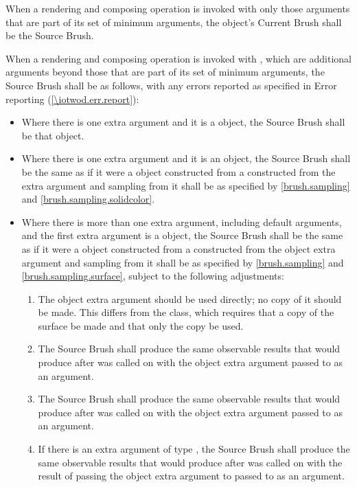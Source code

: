 \pnum
When a rendering and composing operation is invoked with only those arguments that are part of its set of minimum arguments, the  object's Current Brush shall be the Source Brush.

\pnum
When a rendering and composing operation is invoked with , which are additional arguments beyond those that are part of its set of minimum arguments, the Source Brush shall be as follows, with any errors reported as specified in Error reporting (\ref{\iotwod.err.report}):
\begin{itemize}
	\item Where there is one extra argument and it is a  object, the Source Brush shall be that  object.
	\item Where there is one extra argument and it is an  object, the Source Brush shall be the same as if it were a  object constructed from a  constructed from the extra argument and sampling from it shall be as specified by \ref{brush.sampling} and \ref{brush.sampling.solidcolor}.
	\item Where there is more than one extra argument, including default arguments, and the first extra argument is a  object, the Source Brush shall be the same as if it were a  object  constructed from a  constructed from the  object extra argument and sampling from it shall be as specified by \ref{brush.sampling} and \ref{brush.sampling.surface}, subject to the following adjustments:
	\begin{enumerate}
		\item The  object extra argument should be used directly; no copy of it should be made. This differs from the  class, which requires that a copy of the surface be made and that only the copy be used.
		\item The Source Brush shall produce the same observable results that  would produce after  was called on  with the  object extra argument passed to  as an argument.
		\item The Source Brush shall produce the same observable results that  would produce after  was called on  with the  object extra argument passed to  as an argument.
		\item If there is an extra argument of type , the Source Brush shall produce the same observable results that  would produce after  was called on  with the result of passing the  object extra argument to  passed to  as an argument.

\end{enumerate}
\end{itemize}
